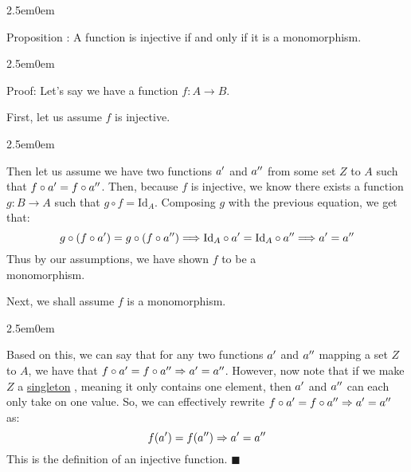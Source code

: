 \documentclass{book}
\newcommand{\hTwo}{%
   \color{MidnightBlue}%
   \fontsize{13}{13}\selectfont%
}
\newcommand{\hThree}{%
   \color{PineGreen}
   \fontsize{13}{13}\selectfont%
}
\newenvironment{myIndent}{%
   \begin{adjustwidth}{2.5em}{0em}%
}{%
   \end{adjustwidth}%
}
\newcommand{\udefine}[1]{%
   \setulcolor{Red}%
   \setul{0.1ex}{0.15ex}%
   \ul{#1}%
}
\newcommand{\pprime}{\prime\prime}
\newcounter{PropNumber}
\newcommand{\propCount}{%
   \stepcounter{PropNumber}%
   \thePropNumber%
}
\begin{document}
   
   \begin{myIndent}
      \hTwo
      Proposition \propCount: A function is injective if and only if
      it is a monomorphism.

      \begin{myIndent}
         \hThree
         Proof: Let's say we have a function $f: A \rightarrow B$.
         \hfill \bigbreak

         First, let us assume $f$ is injective.
         
         \begin{myIndent}
            Then let us assume we have two functions $a\sp{\prime}$ 
            and $a\sp{\pprime}$ from some set $Z$ to $A$ such that 
            $f \circ a\sp{\prime} = f \circ a\sp{\pprime}$. Then, 
            because $f$ is injective, we know there exists a function
            $g: B \rightarrow A$ such that $g \circ f = \mathrm{Id}_A$.
            Composing $g$ with the previous equation, we get that:
            \[g\circ(f \circ a\sp{\prime}) = g \circ (f \circ 
            a\sp{\pprime}) \Longrightarrow \mathrm{Id}_A \circ a\sp{\prime}
            = \mathrm{Id}_A \circ a\sp{\pprime} \Longrightarrow 
            a\sp{\prime} = a\sp{\pprime}\]
            Thus by our assumptions, we have shown $f$ to be a\\
            monomorphism.
         \end{myIndent}
         \newpage

         Next, we shall assume $f$ is a monomorphism.

         \begin{myIndent}
            Based on this, we can say that for any two functions 
            $a\sp{\prime}$ and $a\sp{\pprime}$ mapping a set
            $Z$ to $A$, we have that $f \circ a\sp{\prime}
            = f \circ a\sp{\pprime} \Rightarrow a\sp{\prime} = 
            a\sp{\pprime}$. However, now note that if we make $Z$ a 
            \udefine{singleton}, meaning it only contains one element, 
            then $a\sp{\prime}$ and $a\sp{\pprime}$ can each
            only take on one value. So, we can effectively rewrite
            $f \circ a\sp{\prime} = f \circ a\sp{\pprime}
            \Rightarrow a\sp{\prime} = a\sp{\pprime}$ as:
            \[f(a\sp{\prime}) = f(a\sp{\pprime}) \Rightarrow 
            a\sp{\prime} = a\sp{\pprime}\]
            This is the definition of an injective function. $\blacksquare$
         \end{myIndent}
      \end{myIndent}
   \end{myIndent}
\end{document}
